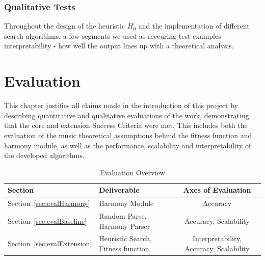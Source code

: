 \documentclass[12pt,a4paper,twoside,openany]{report} \usepackage[pdfborder={0 0 0}]{hyperref}    %
\theoremstyle{definition} \newtheorem{definition}{Definition}[section]
\begin{document}
  \subsection{Qualitative Tests} Throughout the design of the heuristic $H_0$ and the implementation of different search
  algorithms, a few segments we used as reccuring test examples - interpretability - how well the output lines up with
  a theoretical analysis.

\chapter{Evaluation} 
\label{chap:evaluation}

This chapter justifies all claims made in the introduction of this project by describing quantitative and qualitative
evaluations of the work, demonstrating that the core and extension Success Criteria were met. This includes both the
evaluation of the music theoretical assumptions behind the fitness function and harmony module, as well as the
performance, scalability and interpretability of the developed algorithms.

  \begin{table}[ht!] 
  \caption{Evaluation Overview} 
  \label{tab:evaluationOverview} 
  \centering
  {\small
  \begin{tabularx}{0.8\textwidth}{lXc} 
    Section & Deliverable & Axes of Evaluation  \\
    \toprule 
    Section~\ref{sec:evalHarmony} & Harmony Module & Accuracy \\
    Section~\ref{sec:evalBaseline} & Random Parse, Harmony Parser & Accuracy, Scalability \\
    Section~\ref{sec:evalExtension}& Heuristic Search, Fitness function & Interpretability, Accuracy, Scalability \\
    \end{tabularx} 
  }
  \end{table}

\end{document}
